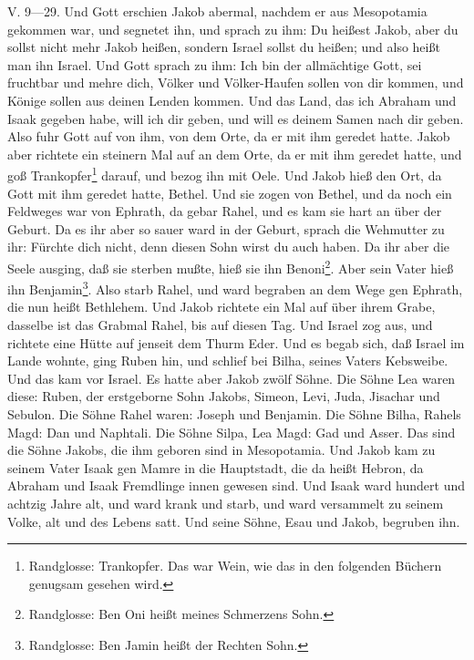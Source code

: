V. 9—29. Und Gott erschien Jakob abermal, nachdem er aus Mesopotamia gekommen war, und segnetet ihn, und sprach zu ihm: Du heißest Jakob, aber du sollst nicht mehr Jakob heißen, sondern Israel sollst du heißen; und also heißt man ihn Israel. Und Gott sprach zu ihm: Ich bin der allmächtige Gott, sei fruchtbar und mehre dich, Völker und Völker-Haufen sollen von dir kommen, und Könige sollen aus deinen Lenden kommen. Und das Land, das ich Abraham und Isaak gegeben habe, will ich dir geben, und will es deinem Samen nach dir geben. Also fuhr Gott auf von ihm, von dem Orte, da er mit ihm geredet hatte. Jakob aber richtete ein steinern Mal auf an dem Orte, da er mit ihm geredet hatte, und goß Trankopfer\footnote{Randglosse: Trankopfer. Das war Wein, wie das in den folgenden Büchern genugsam gesehen wird.} darauf, und bezog ihn mit Oele. Und Jakob hieß den Ort, da Gott mit ihm geredet hatte, Bethel. Und sie zogen von Bethel, und da noch ein Feldweges war von Ephrath, da gebar Rahel, und es kam sie hart an über der Geburt. Da es ihr aber so sauer ward in der Geburt, sprach die Wehmutter zu ihr: Fürchte dich nicht, denn diesen Sohn wirst du auch haben. Da ihr aber die Seele ausging, daß sie sterben mußte, hieß sie ihn Benoni\footnote{Randglosse: Ben Oni heißt meines Schmerzens Sohn.}. Aber sein Vater hieß ihn Benjamin\footnote{Randglosse: Ben Jamin heißt der Rechten Sohn.}. Also starb Rahel, und ward begraben an dem Wege gen Ephrath, die nun heißt Bethlehem. Und Jakob richtete ein Mal auf über ihrem Grabe, dasselbe ist das Grabmal Rahel, bis auf diesen Tag. Und Israel zog aus, und richtete eine Hütte auf jenseit dem Thurm Eder. Und es begab sich, daß Israel im Lande wohnte, ging Ruben hin, und schlief bei Bilha, seines Vaters Kebsweibe. Und das kam vor Israel. Es hatte aber Jakob zwölf Söhne. Die Söhne Lea waren diese: Ruben, der erstgeborne Sohn Jakobs, Simeon, Levi, Juda, Jisachar und Sebulon. Die Söhne Rahel waren: Joseph und Benjamin. Die Söhne Bilha, Rahels Magd: Dan und Naphtali. Die Söhne Silpa, Lea Magd: Gad und Asser. Das sind die Söhne Jakobs, die ihm geboren sind in Mesopotamia. Und Jakob kam zu seinem Vater Isaak gen Mamre in die Hauptstadt, die da heißt Hebron, da Abraham und Isaak Fremdlinge innen gewesen sind. Und Isaak ward hundert und achtzig Jahre alt, und ward krank und starb, und ward versammelt zu seinem Volke, alt und des Lebens satt. Und seine Söhne, Esau und Jakob, begruben ihn.





